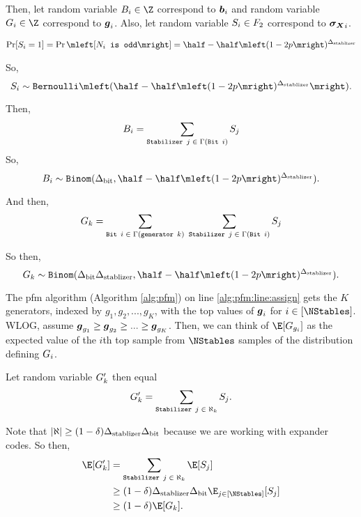 Then, let random variable $\bitscoreRV_i \in \Z$ correspond to $\boldsymbol{b}_i$ and random variable $\generatorscoreRV_i \in \Z$
correspond to $\boldsymbol{g}_i$. Also, let random variable $S_i \in F_2$ correspond  to $\boldsymbol{\boldsymbol{\sigma_X}}_i$.

\newcommand{\SPr}{\half - \half\mleft(1-2p\mright)^\DegStable}
\begin{align*}
	\Pr[S_i = 1] = \Pr\mleft[\texttt{$N_i$ is odd}\mright] = \SPr
\end{align*}

So,
$$
	\syndromeRV_i \sim \texttt{Bernoulli}\mleft(\SPr\mright).
$$

Then,
$$
	B_i = \sum_{\texttt{Stabilizer $j$} \; \in \; \Gamma(\texttt{Bit $i$})} S_j
$$
So, 
$$
	\bitscoreRV_i \sim \texttt{Binom}(\DegBit, \SPr).
$$

And then,
$$
	G_k =
		\sum_{\texttt{Bit $i$} \; \in \; \Gamma(\texttt{generator } k)}\;
			\sum_{\texttt{Stabilizer } j \; \in \; \Gamma(\texttt{Bit } i)}
				S_j
$$

So then,
$$
	\generatorscoreRV_k \sim \texttt{Binom}(\DegBit \DegStable, \SPr).
$$

The pfm algorithm (Algorithm \ref{alg:pfm}) on line \ref{alg:pfm:line:assign}
gets the $K$ generators, indexed by $g_1, g_2, ..., g_K$, with the top values
of $\boldsymbol{g}_i$ for $i \in [\NStables]$. WLOG, assume
$\boldsymbol{g}_{g_1} \geq \boldsymbol{g}_{g_2} \geq ... \geq \boldsymbol{g}_{g_K}$.
Then, we can think of $\E[\generatorscoreRV_{g_i}]$ as the expected value of the $i$th
top sample from $\NStables$ samples of the distribution defining $G_i$.

Let random variable $G'_k$ then equal
$$
	G'_k =
		\sum_{\texttt{Stabilizer $j$} \; \in \; \aleph_k} S_j.
$$

Note that $|\aleph| \geq (1 - \delta) {\Delta_{\text{stablizer}}} {\Delta_{\text{bit}}}$ because we are working with expander codes.
So then, \begin{align*}
	\E[\genscoreRVCorrected_k] &= 
		\sum_{\texttt{Stabilizer $j$} \; \in \; \aleph_k} \E[\syndromeRV_j] \\
		&\geq (1 - \delta) \DegStable \DegBit \E_{j \in [\NStables]}[\syndromeRV_j]\\
		&\geq (1 - \delta) \E[\generatorscoreRV_k].
\end{align*}

